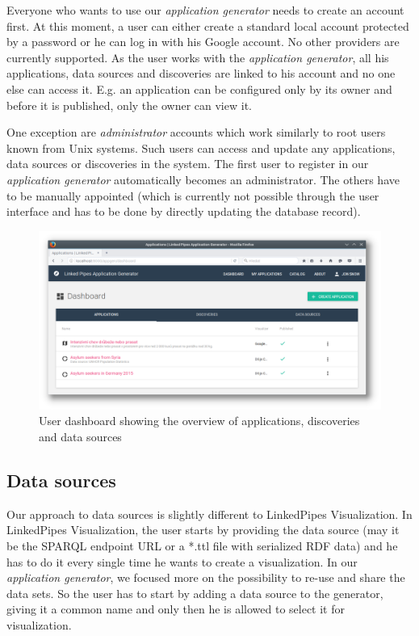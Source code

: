 Everyone who wants to use our \emph{application generator} needs to create an account first. At this moment, a user can either create a standard local account protected by a password or he can log in with his Google account. No other providers are currently supported. As the user works with the \emph{application generator}, all his applications, data sources and discoveries are linked to his account and no one else can access it. E.g. an application can be configured only by its owner and before it is published, only the owner can view it.

One exception are \emph{administrator} accounts which work similarly to root users known from Unix systems. Such users can access and update any applications, data sources or discoveries in the system. The first user to register in our \emph{application generator} automatically becomes an administrator. The others have to be manually appointed (which is currently not possible through the user interface and has to be done by directly updating the database record).

\begin{figure}
	\centering
	\includegraphics[width=145mm]{img/05_dashboard}
	\caption{User dashboard showing the overview of applications, discoveries and data sources}
    \label{fig:dashboard}
\end{figure}

\subsection{Data sources}

Our  approach to data sources is slightly different to LinkedPipes Visualization. In LinkedPipes Visualization, the user starts by providing the data source (may it be the SPARQL endpoint URL or a *.ttl file with serialized RDF data) and he has to do it every single time he wants to create a visualization. In our \emph{application generator}, we focused more on the possibility to re-use and share the data sets. So the user has to start by adding a data source to the generator, giving it a common name and only then he is allowed to select it for visualization. 

